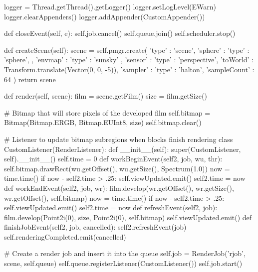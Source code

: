 \begin{python}
        logger = Thread.getThread().getLogger()
        logger.setLogLevel(EWarn)
        logger.clearAppenders()
        logger.addAppender(CustomAppender())

    def closeEvent(self, e):
        self.job.cancel()
        self.queue.join()
        self.scheduler.stop()

    def createScene(self):
        scene = self.pmgr.create({
            'type' : 'scene',
            'sphere' : {
                'type' : 'sphere',
            },
            'envmap' : {
                'type' : 'sunsky'
            },
            'sensor' : {
                'type' : 'perspective',
                'toWorld' : Transform.translate(Vector(0, 0, -5)),
                'sampler' : {
                    'type' : 'halton',
                    'sampleCount' : 64
                }
            }
        })
        return scene

    def render(self, scene):
        film = scene.getFilm()
        size = film.getSize()

        # Bitmap that will store pixels of the developed film
        self.bitmap = Bitmap(Bitmap.ERGB, Bitmap.EUInt8, size)
        self.bitmap.clear()

        # Listener to update bitmap subregions when blocks finish rendering
        class CustomListener(RenderListener):
            def __init__(self):
                super(CustomListener, self).__init__()
                self.time = 0
            def workBeginEvent(self2, job, wu, thr):
                self.bitmap.drawRect(wu.getOffset(), wu.getSize(), Spectrum(1.0))
                now = time.time()
                if now - self2.time > .25:
                    self.viewUpdated.emit()
                    self2.time = now
            def workEndEvent(self2, job, wr):
                film.develop(wr.getOffset(), wr.getSize(),
                    wr.getOffset(), self.bitmap)
                now = time.time()
                if now - self2.time > .25:
                    self.viewUpdated.emit()
                    self2.time = now
            def refreshEvent(self2, job):
                film.develop(Point2i(0), size, Point2i(0), self.bitmap)
                self.viewUpdated.emit()
            def finishJobEvent(self2, job, cancelled):
                self2.refreshEvent(job)
                self.renderingCompleted.emit(cancelled)

        # Create a render job and insert it into the queue
        self.job = RenderJob('rjob', scene, self.queue)
        self.queue.registerListener(CustomListener())
        self.job.start()


\end{python}

